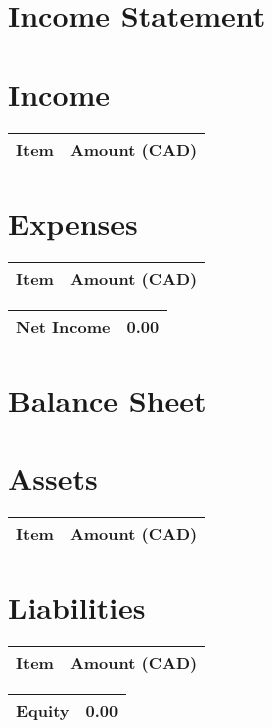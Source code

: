 \section*{Income Statement}
\section*{Income}
\begin{tabular}{l r}
\toprule
Item & Amount (CAD) \\
\midrule
\bottomrule
\end{tabular}

\section*{Expenses}
\begin{tabular}{l r}
\toprule
Item & Amount (CAD) \\
\midrule
\bottomrule
\end{tabular}

\begin{tabular}{l r}
\toprule
\textbf{Net Income} & \textbf{0.00} \\
\bottomrule
\end{tabular}

\section*{Balance Sheet}
\section*{Assets}
\begin{tabular}{l r}
\toprule
Item & Amount (CAD) \\
\midrule
\bottomrule
\end{tabular}

\section*{Liabilities}
\begin{tabular}{l r}
\toprule
Item & Amount (CAD) \\
\midrule
\bottomrule
\end{tabular}

\begin{tabular}{l r}
\toprule
\textbf{Equity} & \textbf{0.00} \\
\bottomrule
\end{tabular}

